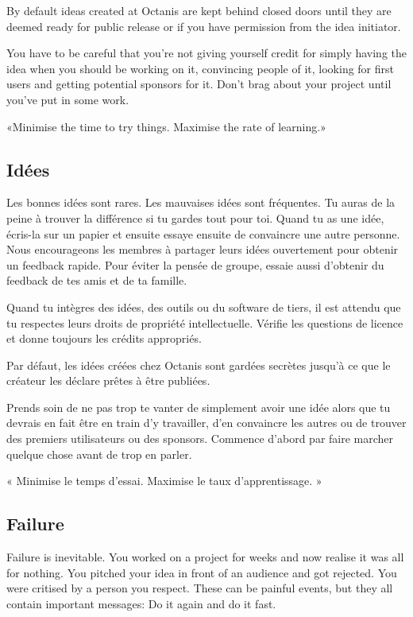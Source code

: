 	By default ideas created at Octanis are kept behind closed doors until they are deemed ready for public release or if you have permission from the idea initiator.

	You have to be careful that you're not giving yourself credit for simply having the idea when you should be working on it, convincing people of it, looking for first users and getting potential sponsors for it. Don't brag about your project until you've put in some work.

	«Minimise the time to try things. Maximise the rate of learning.»





\french
	\subsection{Idées}
	Les bonnes idées sont rares. Les mauvaises idées sont fréquentes. Tu auras de la peine à trouver la différence si tu gardes tout pour toi. 
	Quand tu as une idée, écris-la sur un papier et ensuite essaye ensuite de convaincre une autre personne. Nous encourageons les membres à partager leurs idées ouvertement pour obtenir un feedback rapide. Pour éviter la pensée de groupe, essaie aussi d'obtenir du feedback de tes amis et de ta famille. 

	Quand tu intègres des idées, des outils ou du software de tiers, il est attendu que tu respectes leurs droits de propriété intellectuelle. Vérifie les questions de licence et donne toujours les crédits appropriés.

	Par défaut, les idées créées chez Octanis sont gardées secrètes jusqu'à ce que le créateur les déclare prêtes à être publiées.

	Prends soin de ne pas trop te vanter de simplement avoir une idée alors que tu devrais en fait être en train d'y travailler, d'en convaincre les autres ou de trouver des premiers utilisateurs ou des sponsors. Commence d'abord par faire marcher quelque chose avant de trop en parler. 

	« Minimise le temps d'essai. Maximise le taux d'apprentissage. »




\english
	\subsection{Failure}
	Failure is inevitable. You worked on a project for weeks and now realise it was all for nothing. You pitched your idea in front of an audience and got rejected. You were critised by a person you respect. 
	These can be painful events, but they all contain important messages: Do it again and do it fast.

